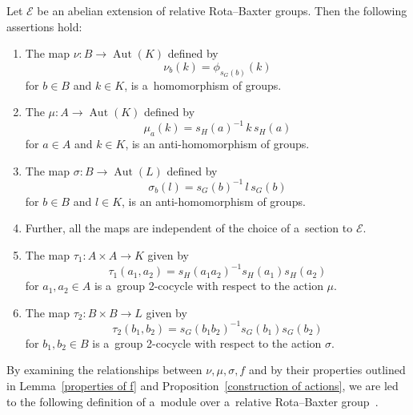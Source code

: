\documentclass{jonasart}
\theoremstyle{plain}
\DeclareMathOperator{\Aut}{Aut}
\begin{document}
	\begin{proposition}[\!\!{\cite[Proposition 3.7]{MR4819014}}] \label{construction of actions}
		Let $\mathcal{E}$ be an abelian extension of relative Rota--Baxter groups. Then the following assertions hold:
		\begin{enumerate}
			\item The map $\nu: B \rightarrow \Aut(K)$ defined by
			\begin{equation}\label{nuact}
				\nu_b (k)= \phi_{s_G (b)}(k)
			\end{equation}
			for $b \in B$ and $k \in K$, is a~homomorphism of groups.
			\item The $\mu: A \rightarrow \Aut(K)$ defined by
			\begin{equation}\label{muact}
				\mu_a (k)=s_H (a)^{-1}\, k\, s_H (a)
			\end{equation}
			for $a \in A$ and $ k \in K$, is an anti-homomorphism of groups.
			\item The map $\sigma: B \rightarrow \Aut(L)$ defined by
			\begin{equation}\label{sigmaact}
				\sigma_b (l)=s_G (b)^{-1}\,l\, s_G (b)
			\end{equation}
			for $b \in B$ and $ l \in K$, is an anti-homomorphism of groups.
			
			\item[] 	Further, all the maps are independent of the choice of a~section to $\mathcal{E}$.
			\item The map $\tau_1: A \times A \rightarrow K$ given by
			\begin{equation}\label{mucocycle}
				\tau_1 (a_1, a_2 )= s_H (a_1 a_2 )^{-1}s_H (a_1 )s_H (a_2 )
			\end{equation}
			for $a_1, a_2 \in A$ is a~group 2-cocycle with respect to the action $\mu$.
			\item The map $\tau_2: B \times B \rightarrow L$ given by
			\begin{equation}\label{sigmacocycle}
				\tau_2 (b_1, b_2 )= s_G (b_1 b_2 )^{-1}s_G (b_1 )s_G (b_2 )
			\end{equation}
			for	$b_1, b_2 \in B$ is a~group 2-cocycle with respect to the action $\sigma$.
		\end{enumerate}
	\end{proposition}
	
	By examining the relationships between $\nu, \mu, \sigma, f$ and by their properties outlined in Lemma~\ref{properties of f} and Proposition~\ref{construction of actions}, we are led to the following definition of a~module over a~relative Rota--Baxter group~\cite[Definition 3.12]{MR4819014}.
	
\end{document}
